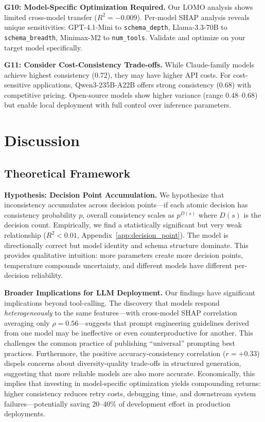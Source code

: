 \documentclass[sigconf,anonymous,review]{acmart}
\begin{document}
\textbf{G10: Model-Specific Optimization Required.} Our LOMO analysis shows limited cross-model transfer ($R^2 = -0.009$). Per-model SHAP analysis reveals unique sensitivities: GPT-4.1-Mini to \texttt{schema\_depth}, Llama-3.3-70B to \texttt{schema\_breadth}, Minimax-M2 to \texttt{num\_tools}. Validate and optimize on your target model specifically.

\textbf{G11: Consider Cost-Consistency Trade-offs.} While Claude-family models achieve highest consistency (0.72), they may have higher API costs. For cost-sensitive applications, Qwen3-235B-A22B offers strong consistency (0.68) with competitive pricing. Open-source models show higher variance (range 0.48--0.68) but enable local deployment with full control over inference parameters.

\section{Discussion}
\label{sec:discussion}

\subsection{Theoretical Framework}

\textbf{Hypothesis: Decision Point Accumulation.} We hypothesize that inconsistency accumulates across decision points---if each atomic decision has consistency probability $p$, overall consistency scales as $p^{D(s)}$ where $D(s)$ is the decision count. Empirically, we find a statistically significant but very weak relationship ($R^2 < 0.01$, Appendix~\ref{app:decision_point}). The model is directionally correct but model identity and schema structure dominate. This provides qualitative intuition: more parameters create more decision points, temperature compounds uncertainty, and different models have different per-decision reliability.

\textbf{Broader Implications for LLM Deployment.} Our findings have significant implications beyond tool-calling. The discovery that models respond \textit{heterogeneously} to the same features---with cross-model SHAP correlation averaging only $\rho=0.56$---suggests that prompt engineering guidelines derived from one model may be ineffective or even counterproductive for another. This challenges the common practice of publishing ``universal'' prompting best practices. Furthermore, the positive accuracy-consistency correlation ($r=+0.33$) dispels concerns about diversity-quality trade-offs in structured generation, suggesting that more reliable models are also more accurate. Economically, this implies that investing in model-specific optimization yields compounding returns: higher consistency reduces retry costs, debugging time, and downstream system failures---potentially saving 20--40\% of development effort in production deployments.
\end{document}
